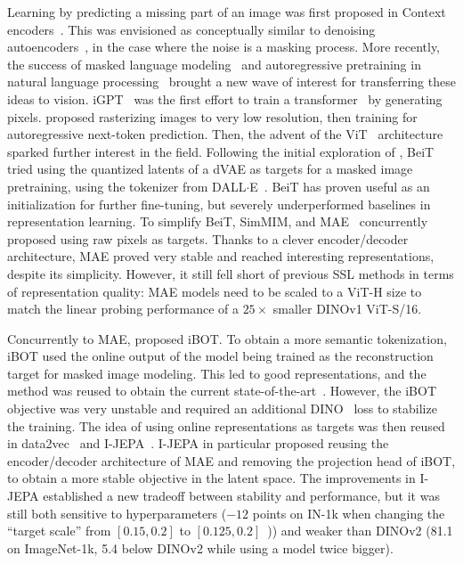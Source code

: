 Learning by predicting a missing part of an image was first proposed in Context encoders~\citep{pathakCVPR16context}.
This was envisioned as conceptually similar to denoising autoencoders~\citep{vincent2008extracting}, in the case where the noise is a masking process.
More recently, the success of masked language modeling~\citep{bert} and autoregressive pretraining in natural language processing~\citep{gpt} brought a new wave of interest for transferring these ideas to vision.
iGPT~\citep{igpt} was the first effort to train a transformer~\citep{vaswani2017attention} by generating pixels.
\citet{igpt} proposed rasterizing images to very low resolution, then training for autoregressive next-token prediction.
Then, the advent of the ViT~\citep{dosovitskiy2020image} architecture sparked further interest in the field.
Following the initial exploration of \citet{dosovitskiy2020image}, BeiT~\citep{beit} tried using the quantized latents of a dVAE as targets for a masked image pretraining, using the tokenizer from DALL$\cdot$E~\citep{ramesh2021clip}.
BeiT has proven useful as an initialization for further fine-tuning, but severely underperformed baselines in representation learning.
To simplify BeiT, SimMIM, and MAE~\citep{xie2021simmim, he2021masked} concurrently proposed using raw pixels as targets. 
Thanks to a clever encoder/decoder architecture, MAE proved very stable and reached interesting representations, despite its simplicity.
However, it still fell short of previous SSL methods in terms of representation quality: MAE models need to be scaled to a ViT-H size to match the linear probing performance of a $25\times$ smaller DINOv1 ViT-S/16\citep{dino}.

Concurrently to MAE, \citet{ibot} proposed iBOT. To obtain a more semantic tokenization, iBOT used the online output of the model being trained as the reconstruction target for masked image modeling.
This led to good representations, and the method was reused to obtain the current state-of-the-art~\citep{dinov2}.
However, the iBOT objective was very unstable and required an additional DINO~\citep{dino} loss to stabilize the training.
The idea of using online representations as targets was then reused in data2vec~\citep{data2vec} and I-JEPA~\citep{ijepa,barstochastic}.
I-JEPA in particular proposed reusing the encoder/decoder architecture of MAE and removing the projection head of iBOT, to obtain a more stable objective in the latent space.
The improvements in I-JEPA established a new tradeoff between stability and performance, but it was still both sensitive to hyperparameters ($-12$ points on IN-1k when changing the ``target scale''  from $[0.15,0.2]$ to $[0.125,0.2]$~\citep{ijepa})) and weaker than DINOv2 (81.1 on ImageNet-1k, 5.4 below DINOv2 while using a model twice bigger).

